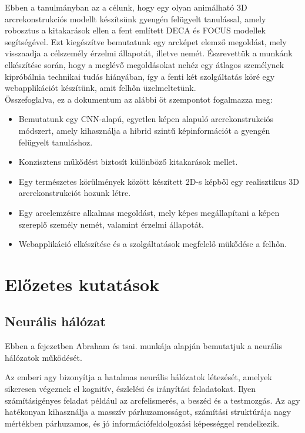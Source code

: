 \documentclass[12pt,a4]{article}
\begin{document}
        Ebben a tanulmányban az a célunk, hogy egy olyan animálható 3D arcrekonstrukciós modellt készítsünk gyengén felügyelt tanulással, amely robosztus a kitakarások ellen a fent említett DECA és FOCUS modellek segítségével. Ezt kiegészítve bemutatunk egy arcképet elemző megoldást, mely visszaadja a célszemély érzelmi állapotát, illetve nemét. Észrevettük a munkánk elkészítése során, hogy a meglévő megoldásokat nehéz egy átlagos személynek kipróbálnia technikai tudás hiányában, így a fenti két szolgáltatás köré egy webapplikációt készítünk, amit felhőn üzelmeltetünk.\\

        Összefoglalva, ez a dokumentum az alábbi öt szempontot fogalmazza meg:
        \begin{itemize}
	       \item Bemutatunk egy CNN-alapú, egyetlen képen alapuló arcrekonstrukciós módszert, amely kihasználja a hibrid szintű képinformációt a gyengén felügyelt tanuláshoz.
	       \item Konzisztens műkődést biztosít különböző kitakarások mellet.
	       \item Egy természetes körülmények között készített 2D-s képből egy realisztikus 3D arcrekonstrukciót hozunk létre.
	       \item Egy arcelemzésre alkalmas megoldást, mely képes megállapítani a képen szereplő személy nemét, valamint érzelmi állapotát.
	       \item Webapplikáció elkészítése és a szolgáltatások megfelelő mükődése a felhőn.
        \end{itemize}

    \section{Előzetes kutatások}
	\subsection{Neurális hálózat}
    Ebben a fejezetben Abraham és tsai. \cite{ann} munkája alapján bemutatjuk a neurális hálózatok működését.
    
	\label{NN}
	Az emberi agy bizonyítja a hatalmas neurális hálózatok létezését, amelyek sikeresen végeznek el kognitív, észlelési és irányítási feladatokat. Ilyen számításigényes feladat például az arcfelismerés, a beszéd és a testmozgás. Az agy hatékonyan kihasználja a masszív párhuzamosságot, számítási struktúrája nagy mértékben párhuzamos, és jó információfeldolgozási képességgel rendelkezik.
	
\end{document}
